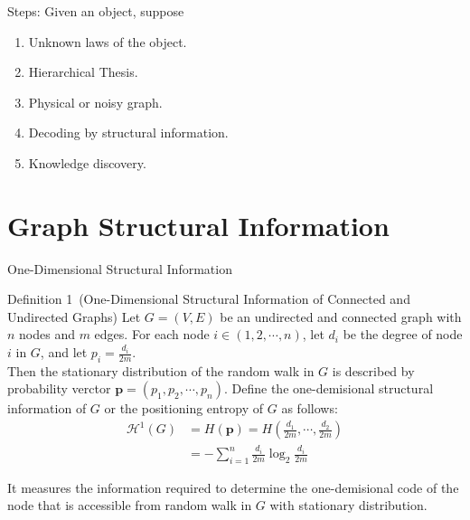 \documentclass[t,aspectratio=169,usepdftitle=false]{beamer}
\begin{document}
  \begin{frame}{Steps:}
    Given an object, suppose
    \begin{enumerate}
      \item Unknown laws of the object.
      \item Hierarchical Thesis.
      \item Physical or noisy graph.
      \item Decoding by structural information.
      \item Knowledge discovery.
    \end{enumerate}
  \end{frame}


\section{Graph Structural Information}
  \begin{frame}{One-Dimensional Structural Information}
    \begin{exampleblock}{Definition 1~(One-Dimensional Structural Information of Connected and Undirected Graphs)}
      Let $G=(V, E)$ be an undirected and connected graph with $n$ nodes and $m$ edges.
      For each node $i \in (1,2,\cdots,n)$, let $d_i$ be the degree of node $i$ in $G$, and let $p_i=\frac{d_i}{2m}$. \\
      Then the stationary distribution of the random walk in $G$ is described by probability verctor $\bm{p}=(p_1,p_2,\cdots,p_n)$.
      Define the one-demisional structural information of $G$ or the positioning entropy of $G$ as follows:
      \begin{equation}
        \begin{aligned}
          \mathcal{H}^{1}(G) &= H(\bm{p}) = H\left( \frac{d_1}{2m},\cdots,\frac{d_2}{2m} \right) \\
                             &= - \sum_{i=1}^{n} \frac{d_i}{2m} \log_{2} \frac{d_i}{2m}
        \end{aligned}
      \end{equation} 
    \end{exampleblock}
    It measures the information required to determine the one-demisional code of the node that is accessible from random walk in $G$ with stationary distribution.
  \end{frame}
\end{document}
